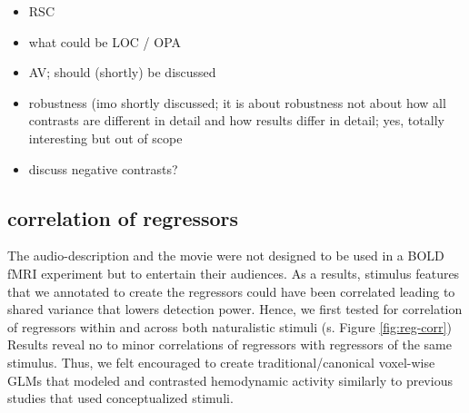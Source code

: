 \documentclass[english]{article}
\begin{document}

\begin{itemize}
    \item RSC
    \item what could be LOC / OPA
    \item AV; should (shortly) be discussed
    \item robustness (imo shortly discussed; it is about robustness not about
        how all contrasts are different in detail and how results differ in
        detail; yes, totally interesting but out of scope
    \item discuss negative contrasts?
\end{itemize}

\subsection{correlation of regressors}

The audio-description and the movie were not designed to be used in a BOLD fMRI
experiment but to entertain their audiences.
%
As a results, stimulus features that we annotated to create the regressors could
have been correlated leading to shared variance that lowers detection power.
Hence, we first tested for correlation of regressors within and across both
naturalistic stimuli (s. Figure \ref{fig:reg-corr})
Results reveal no to minor correlations of regressors with regressors of the
same stimulus.
Thus, we felt encouraged to create traditional/canonical voxel-wise GLMs that
modeled and contrasted hemodynamic activity similarly to previous studies that
used conceptualized stimuli.




\end{document}
